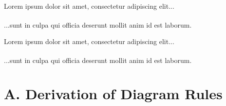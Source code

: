 \documentclass{article}
\newcommand{\lorem}[1]{
    Lorem ipsum dolor sit amet, consectetur adipiscing elit...\\
    \nopagebreak\vspace{#1cm} \ \\
    ...sunt in culpa qui officia deserunt mollit anim id est laborum.
}
\begin{document}

    
    

    \lorem{3}
    \lorem{3}


\section*{A. Derivation of Diagram Rules}
\end{document}
